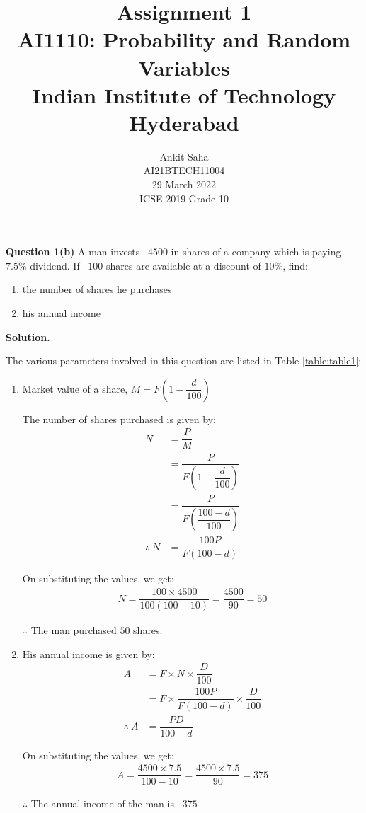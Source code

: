 \documentclass[journal,12pt,twocolumn]{IEEEtran}
\title{Assignment 1 \\ \Large AI1110: Probability and Random Variables \\ \large Indian Institute of Technology Hyderabad}
\author{Ankit Saha \\ \normalsize AI21BTECH11004 \\ \vspace*{20pt} \normalsize  29 March 2022 \\ \vspace*{20pt} \Large ICSE 2019 Grade 10}
\begin{document}
	\maketitle
	
	\textbf{Question 1(b)} 
	A man invests \rupee~$4500$ in shares of a company which is paying $7.5\%$ dividend. If \rupee~$100$ shares are available at a discount of $10\%$, find:
	\begin{enumerate}[label=(\roman*)]
		\item the number of shares he purchases
		\item his annual income
	\end{enumerate}	
	
	\textbf{Solution.}
	
	The various parameters involved in this question are listed in Table \eqref{table:table1}:
	\begin{table}[ht!]
		
		\vspace*{5pt}
		\caption{}
		\label{table:table1}	
	\end{table}
	
	\begin{enumerate}[label=(\roman*)]
		\item Market value of a share, $M = F \left(1 - \dfrac{d}{100} \right)$
		
		The number of shares purchased is given by: 		
		\begin{align}
			N &= \dfrac{P}{M} \\ 
			&= \dfrac{P}{F \left(1 - \dfrac{d}{100} \right)} \\
			&= \dfrac{P}{F \left(\dfrac{100 - d}{100} \right)} \\
 			\therefore~N &= \dfrac{100P}{F(100-d)}
		\end{align}
		
		On substituting the values, we get:
		\begin{align}
			N = \dfrac{100 \times 4500}{100(100 - 10)} = \dfrac{4500}{90} = 50
		\end{align}
		
		$\therefore$ The man purchased $50$ shares.
		
		\item His annual income is given by:
		\begin{align}
		 	A &= F \times N \times \dfrac{D}{100} \\ 
		 	&= F \times \dfrac{100P}{F(100-d)} \times \dfrac{D}{100} \\ 
		 	\therefore~A &= \dfrac{PD}{100-d}
		 \end{align}
		 
		 On substituting the values, we get:
		\begin{align}
			A = \dfrac{4500 \times 7.5}{100 - 10} = \dfrac{4500 \times 7.5}{90} = 375
		\end{align}
		
		$\therefore$ The annual income of the man is \rupee~$375$		
		
	\end{enumerate}
			
\end{document}
